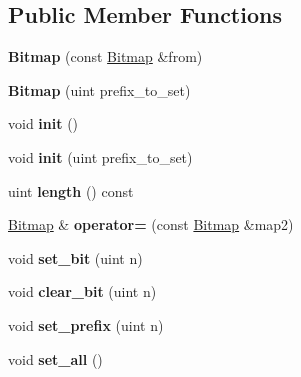 \subsection*{Public Member Functions}
\begin{DoxyCompactItemize}
\item 
\mbox{\label{classBitmap_afcfb729418f8f0d7bb5ffddbf4078346}} 
{\bfseries Bitmap} (const \mbox{\hyperlink{classBitmap}{Bitmap}} \&from)
\item 
\mbox{\label{classBitmap_a100177f6c218ac9c2e9198013ec198ee}} 
{\bfseries Bitmap} (uint prefix\+\_\+to\+\_\+set)
\item 
\mbox{\label{classBitmap_ac732720c129cc92f0c043c6a85247f69}} 
void {\bfseries init} ()
\item 
\mbox{\label{classBitmap_ac7dfd675c70630f1c7b817d35be08c72}} 
void {\bfseries init} (uint prefix\+\_\+to\+\_\+set)
\item 
\mbox{\label{classBitmap_aabcb741aee6a774797122b8a260a7cc8}} 
uint {\bfseries length} () const
\item 
\mbox{\label{classBitmap_afeecf062ddcf6e797a527ba18c69ba0e}} 
\mbox{\hyperlink{classBitmap}{Bitmap}} \& {\bfseries operator=} (const \mbox{\hyperlink{classBitmap}{Bitmap}} \&map2)
\item 
\mbox{\label{classBitmap_aec6717f4c29c91f72f82c3380d128c8f}} 
void {\bfseries set\+\_\+bit} (uint n)
\item 
\mbox{\label{classBitmap_a44fddf34583961ff7474e4341418e8c2}} 
void {\bfseries clear\+\_\+bit} (uint n)
\item 
\mbox{\label{classBitmap_a248e1a112dadc5548d6d878390152e9c}} 
void {\bfseries set\+\_\+prefix} (uint n)
\item 
\mbox{\label{classBitmap_a0ca7bcd4cf56cbebce867af4234429a7}} 
void {\bfseries set\+\_\+all} ()
\item 
\mbox{\label{classBitmap_a32522f2ba35f36698363d66e684721b9}} 

\end{DoxyCompactItemize}
